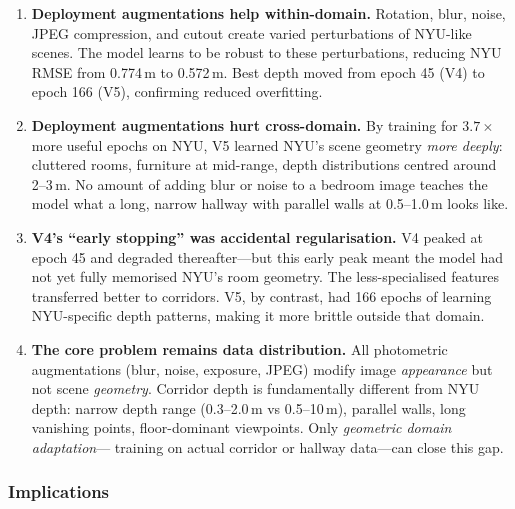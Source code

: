 \documentclass[11pt,a4paper]{article}
\begin{document}
\begin{enumerate}[nosep]
  \item \textbf{Deployment augmentations help within-domain.}
    Rotation, blur, noise, JPEG compression, and cutout create varied
    perturbations of NYU-like scenes. The model learns to be robust to
    these perturbations, reducing NYU RMSE from 0.774\,m to 0.572\,m.
    Best depth moved from epoch 45 (V4) to epoch 166 (V5), confirming
    reduced overfitting.

  \item \textbf{Deployment augmentations hurt cross-domain.}
    By training for $3.7\times$ more useful epochs on NYU, V5 learned
    NYU's scene geometry \emph{more deeply}: cluttered rooms, furniture
    at mid-range, depth distributions centred around 2--3\,m. No amount
    of adding blur or noise to a bedroom image teaches the model what a
    long, narrow hallway with parallel walls at 0.5--1.0\,m looks like.

  \item \textbf{V4's ``early stopping'' was accidental regularisation.}
    V4 peaked at epoch 45 and degraded thereafter---but this early peak
    meant the model had not yet fully memorised NYU's room geometry. The
    less-specialised features transferred better to corridors. V5, by
    contrast, had 166 epochs of learning NYU-specific depth patterns,
    making it more brittle outside that domain.

  \item \textbf{The core problem remains data distribution.}
    All photometric augmentations (blur, noise, exposure, JPEG) modify
    image \emph{appearance} but not scene \emph{geometry}. Corridor depth
    is fundamentally different from NYU depth: narrow depth range
    (0.3--2.0\,m vs 0.5--10\,m), parallel walls, long vanishing points,
    floor-dominant viewpoints. Only \emph{geometric domain adaptation}---
    training on actual corridor or hallway data---can close this gap.
\end{enumerate}

\subsubsection{Implications}
\end{document}
